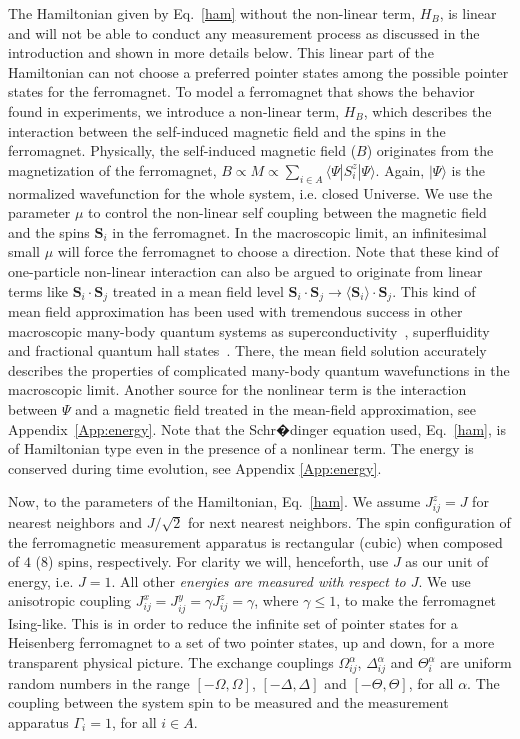 \documentclass[showpacs,preprintnumbers,amsmath,amssymb,12pt]{revtex4-2}
\begin{document}
The Hamiltonian given by Eq.~\eqref{ham} without the non-linear term,
$H_B$, is linear and will not be able to conduct any measurement
process as discussed in the introduction and shown in more details
below. This linear part of the Hamiltonian can not choose a preferred
pointer states among the possible pointer states for the
ferromagnet. To model a ferromagnet that shows the behavior found in
experiments, we introduce a non-linear term, $H_B$, which describes
the interaction between the self-induced magnetic field and the spins
in the ferromagnet. Physically, the self-induced magnetic field ($B$)
originates from the magnetization of the ferromagnet, $B \propto M
\propto \sum_{i\in A} \langle \Psi | S_i^z | \Psi \rangle$. Again,
$|\Psi \rangle$ is the normalized wavefunction for the whole system,
i.e. closed Universe. We use the parameter $\mu$ to control the
non-linear self coupling between the magnetic field and the spins
$\boldsymbol{S}_i$ in the ferromagnet. In the macroscopic limit, an
infinitesimal small $\mu$ will force the ferromagnet to choose a
direction. Note that these kind of one-particle non-linear interaction
can also be argued to originate from linear terms like
$\boldsymbol{S}_i \cdot \boldsymbol{S}_j$ treated in a mean field
level $\boldsymbol{S}_i \cdot \boldsymbol{S}_j \rightarrow \langle
\boldsymbol{S}_i \rangle \cdot \boldsymbol{S}_j$. This kind of mean
field approximation has been used with tremendous success in other
macroscopic many-body quantum systems as
superconductivity~\cite{Tinkham:Book75}, superfluidity~\cite{BEC} and
fractional quantum hall
states~\cite{Tsui82,Laughlin83,Picciotto97}. There, the mean field
solution accurately describes the properties of complicated many-body
quantum wavefunctions in the macroscopic limit. Another source for the
nonlinear term is the interaction between $\Psi$ and a magnetic field
treated in the mean-field approximation, see
Appendix~\ref{App:energy}. Note that the Schr�dinger equation used,
Eq.~\ref{ham}, is of Hamiltonian type even in the presence of a
nonlinear term. The energy is conserved during time evolution, see
Appendix \ref{App:energy}.

Now, to the parameters of the Hamiltonian, Eq.~\ref{ham}. We assume
$J^z_{ij} = J$ for nearest neighbors and $J/\sqrt{2}$ for next nearest
neighbors. The spin configuration of the ferromagnetic measurement
apparatus is rectangular (cubic) when composed of $4$ ($8$) spins,
respectively. For clarity we will, henceforth, use $J$ as our unit of
energy, i.e. $J=1$. All other {\em energies are measured with respect
  to $J$}. We use anisotropic coupling $J_{ij}^{x}=J_{ij}^{y}=\gamma
J_{ij}^{z} = \gamma$, where $\gamma\leq 1$, to make the ferromagnet
Ising-like. This is in order to reduce the infinite set of pointer
states for a Heisenberg ferromagnet to a set of two pointer states, up
and down, for a more transparent physical picture.  The exchange
couplings $\Omega_{ij}^{\alpha}$, $\Delta_{ij}^{\alpha}$ and
$\Theta_i^{\alpha}$ are uniform random numbers in the range
$[-\Omega,\Omega]$, $[-\Delta,\Delta]$ and $[-\Theta,\Theta]$, for all
$\alpha$. The coupling between the system spin to be measured and the
measurement apparatus $\Gamma_{i}=1$, for all $i \in A$.
\end{document}
